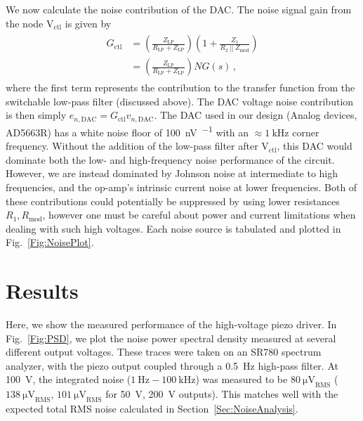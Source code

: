 \documentclass[aip,rsi,reprint]{revtex4-1} %
\newcommand{\epar}{~||~} %
\begin{document}
We now calculate the noise contribution of the DAC.
The noise signal gain from the node $\text{V}_{\text{ctl}}$ is given by
\begin{align}
\begin{split}
\label{Eq:Gdc}
G_{\text{ctl}} &= \left(\frac{Z_\text{LP}}{R_\text{LP} + Z_\text{LP}}\right)\left(1+\frac{Z_1}{R_2\epar Z_{\text{mod}}}\right) \\
&= \left(\frac{Z_\text{LP}}{R_\text{LP} + Z_\text{LP}}\right)NG(s)\,,
\end{split}
\end{align}
where the first term represents the contribution to the transfer function from the switchable low-pass filter (discussed above).
The DAC voltage noise contribution is then simply $e_{n,\text{DAC}} = G_{\text{ctl}} v_{n,\text{DAC}}$. 
The DAC used in our design (Analog devices, AD5663R) has a white noise floor of \SI[per-mode=symbol]{100}{\nano\volt\per\sqrthz} with an $\approx\SI{1}{\kilo\hertz}$ corner frequency.
Without the addition of the low-pass filter after $\text{V}_\text{ctl}$, this DAC would dominate both the low- and high-frequency noise performance of the circuit.
However, we are instead dominated by Johnson noise at intermediate to high frequencies, and the op-amp's intrinsic current noise at lower frequencies.
Both of these contributions could potentially be suppressed by using lower resistances $R_1, R_\text{mod}$, however one must be careful about power and current limitations when dealing with such high voltages.
Each noise source is tabulated and plotted in Fig.~\ref{Fig:NoisePlot}.


\section{Results}
\label{Sec:Results}
Here, we show the measured performance of the high-voltage piezo driver.
In Fig.~\ref{Fig:PSD}, we plot the noise power spectral density measured at several different output voltages.
These traces were taken on an SR780 spectrum analyzer, with the piezo output coupled through a \SI{0.5}{\hertz} high-pass filter. 
At \SI{100}{\volt}, the integrated noise ($\SI{1}{\hertz} - \SI{100}{\kilo\hertz}$) was measured to be $\SI{80}{\micro\volt}_\text{RMS}$ ($\SI{138}{\micro\volt}_\text{RMS}$, $\SI{101}{\micro\volt}_\text{RMS}$ for \SI{50}{\volt}, \SI{200}{\volt} outputs). 
This matches well with the expected total RMS noise calculated in Section~\ref{Sec:NoiseAnalysis}.
\end{document}
